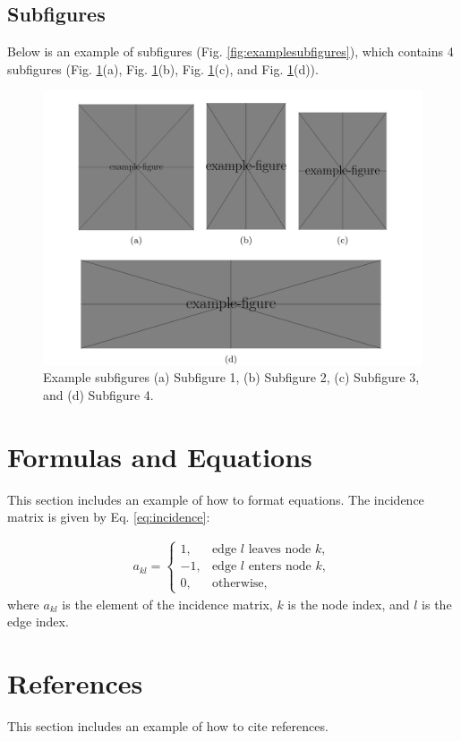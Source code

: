 \documentclass[a4paper]{article}
\begin{document}
\subsection{Subfigures}

Below is an example of subfigures (Fig. \ref{fig:examplesubfigures}), which contains 4 subfigures (Fig. \ref{multifig:multifig_examplesubfigures}(a), Fig. \ref{multifig:multifig_examplesubfigures}(b), Fig. \ref{multifig:multifig_examplesubfigures}(c), and Fig. \ref{multifig:multifig_examplesubfigures}(d)).


\begin{figure}[htbp]
    \centering
    \includegraphics[width=\linewidth]{multifig_examplesubfigures.png}
    \caption{
        Example subfigures (a) Subfigure 1, (b) Subfigure 2, (c) Subfigure 3, and (d) Subfigure 4.
    }
    \label{multifig:multifig_examplesubfigures}
\end{figure}


\section{Formulas and Equations}

This section includes an example of how to format equations. The incidence matrix is given by Eq. \ref{eq:incidence}:

\begin{align}\label{eq:incidence}
    a_{kl}=
    \begin{cases}
        1,  & \text{edge $l$ leaves node $k$},\\
        -1, & \text{edge $l$ enters node $k$},\\
        0,  & \text{otherwise},
    \end{cases}
\end{align}
where $a_{kl}$ is the element of the incidence matrix, $k$ is the node index, and $l$ is the edge index.

\section{References}

This section includes an example of how to cite references\cite{article1}.



\end{document}
